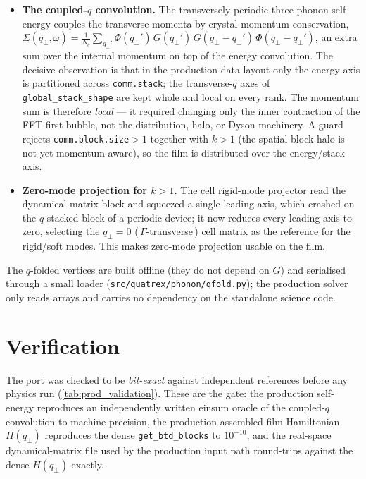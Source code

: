 \begin{itemize}
\item \textbf{The coupled-$q$ convolution.} The transversely-periodic
three-phonon self-energy couples the transverse momenta by
crystal-momentum conservation,
$\Sigma(q_\perp,\omega)=\tfrac{1}{N_q}\sum_{q_\perp'}\widetilde\Phi(q_\perp')\,
G(q_\perp')\,G(q_\perp-q_\perp')\,\widetilde\Phi(q_\perp-q_\perp')$, an
extra sum over the internal momentum on top of the energy convolution.
The decisive observation is that in the production data layout only the
energy axis is partitioned across \texttt{comm.stack}; the transverse-$q$
axes of \texttt{global\_stack\_shape} are kept whole and local on every
rank. The momentum sum is therefore \emph{local} --- it required changing
only the inner contraction of the FFT-first bubble, not the
distribution, halo, or Dyson machinery. A guard rejects
\texttt{comm.block.size}${>}1$ together with $k{>}1$ (the spatial-block
halo is not yet momentum-aware), so the film is distributed over the
energy/stack axis.
\item \textbf{Zero-mode projection for $k>1$.} The cell rigid-mode
projector read the dynamical-matrix block and squeezed a single leading
axis, which crashed on the $q$-stacked block of a periodic device; it now
reduces every leading axis to zero, selecting the $q_\perp{=}0$
(\,$\Gamma$-transverse\,) cell matrix as the reference for the rigid/soft
modes. This makes zero-mode projection usable on the film.
\end{itemize}

The $q$-folded vertices are built offline (they do not depend on $G$) and
serialised through a small loader
(\texttt{src/quatrex/phonon/qfold.py}); the production solver only reads
arrays and carries no dependency on the standalone science code.

\section{Verification}

The port was checked to be \emph{bit-exact} against independent
references before any physics run (\cref{tab:prod_validation}). These are
the gate: the production self-energy reproduces an independently written
einsum oracle of the coupled-$q$ convolution to machine precision, the
production-assembled film Hamiltonian $H(q_\perp)$ reproduces the dense
\texttt{get\_btd\_blocks} to $10^{-10}$, and the real-space
dynamical-matrix file used by the production input path round-trips
against the dense $H(q_\perp)$ exactly.

